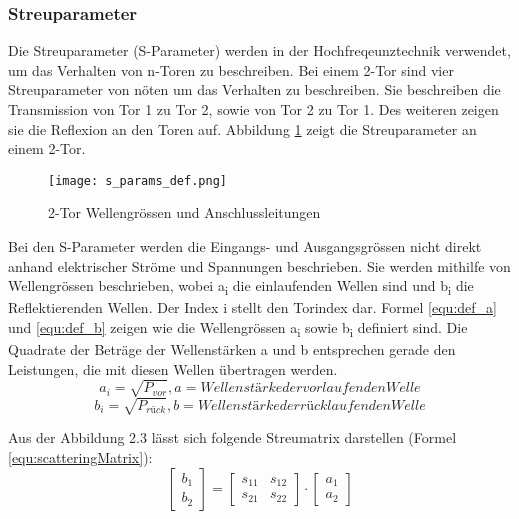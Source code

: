\subsubsection{Streuparameter}\label{subsubsec:streuparameter}

Die Streuparameter (S-Parameter) werden in der Hochfreqeunztechnik verwendet, um das Verhalten von n-Toren zu beschreiben. Bei einem 2-Tor sind vier Streuparameter von nöten um das Verhalten zu beschreiben. Sie beschreiben die Transmission von Tor 1 zu Tor 2, sowie von Tor 2 zu Tor 1. Des weiteren zeigen sie die Reflexion an den Toren auf. Abbildung \ref{fig:2-Tor}  zeigt die Streuparameter an einem 2-Tor. 
\begin{figure}[H]
	\centering
	\texttt{[image: s\_params\_def.png]}
	\caption{2-Tor Wellengrössen und Anschlussleitungen \cite{hftech}}
	\label{fig:2-Tor}
\end{figure}
Bei den S-Parameter werden die Eingangs- und Ausgangsgrössen nicht direkt anhand elektrischer Ströme und Spannungen beschrieben. Sie werden mithilfe von Wellengrössen beschrieben, wobei a\textsubscript{i} die einlaufenden Wellen sind und b\textsubscript{i} die Reflektierenden Wellen. Der Index i stellt den Torindex dar. Formel \ref{equ:def_a} und \ref{equ:def_b} zeigen wie die Wellengrössen a\textsubscript{i} sowie b\textsubscript{i} definiert sind. Die Quadrate der Beträge der Wellenstärken a und b entsprechen gerade den Leistungen, die mit diesen Wellen übertragen werden.
\begin{equation}\label{equ:def_a}
	a_{ i } = \sqrt{ P_{ vor } }, a = Wellenstärke der vorlaufenden Welle
\end{equation}
\begin{equation}\label{equ:def_b}
	b_{ i } = \sqrt{ P_{ rück } }, b = Wellenstärke der rücklaufenden Welle
\end{equation}

Aus der Abbildung 2.3 lässt sich folgende Streumatrix darstellen (Formel \ref{equ:scatteringMatrix}):
\begin{equation}\label{equ:scatteringMatrix}
	\left[
		\begin{matrix}b_1 \\ b_2 \end{matrix}
	\right]
 	=
 	\left[
 		\begin{matrix}
			s_{11}&s_{12} \\s_{21}&s_{22}
		\end{matrix}
	\right]
	\cdot 
	\left[
		\begin{matrix}
			a_1\\a_2
		\end{matrix}
	\right]
\end{equation}

